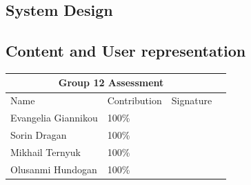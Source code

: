 \documentclass[11pt,a4paper,oneside]{article}
\begin{document}
\subsection{System Design}
\subsection{Content and User representation }

\clearpage 
\printbibliography

\clearpage
\Large
\begin{tabularx}{\textwidth}{|X|X|X|X|}
\hline
\multicolumn{3}{|c|}{Group 12 Assessment}    \\ \hline
Name                & Contribution & Signature \\ \hline
\hline
Evangelia Giannikou & 100\%        &           \\ \hline
Sorin Dragan        & 100\%        &           \\ \hline
Mikhail Ternyuk     & 100\%        &           \\ \hline
Olusanmi Hundogan   & 100\%        &           \\ \hline
\end{tabularx}
\end{document}
